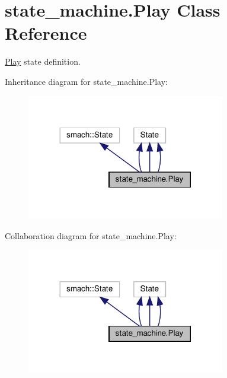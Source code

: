\hypertarget{classstate__machine_1_1Play}{}\section{state\+\_\+machine.\+Play Class Reference}
\label{classstate__machine_1_1Play}


\hyperlink{classstate__machine_1_1Play}{Play} state definition.  




Inheritance diagram for state\+\_\+machine.\+Play\+:
\nopagebreak
\begin{figure}[H]
\begin{center}
\leavevmode
\includegraphics[width=245pt]{classstate__machine_1_1Play__inherit__graph}
\end{center}
\end{figure}


Collaboration diagram for state\+\_\+machine.\+Play\+:
\nopagebreak
\begin{figure}[H]
\begin{center}
\leavevmode
\includegraphics[width=245pt]{classstate__machine_1_1Play__coll__graph}
\end{center}
\end{figure}
